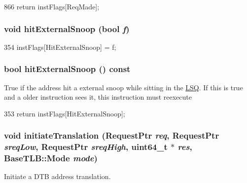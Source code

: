 \begin{DoxyCode}
866 { return instFlags[ReqMade]; }
\end{DoxyCode}
\hypertarget{classBaseDynInst_a75605c294a03028c695549f020222b2e}{
\subsubsection[{hitExternalSnoop}]{\setlength{\rightskip}{0pt plus 5cm}void hitExternalSnoop (bool {\em f})}}
\label{classBaseDynInst_a75605c294a03028c695549f020222b2e}



\begin{DoxyCode}
354 { instFlags[HitExternalSnoop] = f; }
\end{DoxyCode}
\hypertarget{classBaseDynInst_a58f775b4d0db28ea4537417ee746ba89}{
\subsubsection[{hitExternalSnoop}]{\setlength{\rightskip}{0pt plus 5cm}bool hitExternalSnoop () const}}
\label{classBaseDynInst_a58f775b4d0db28ea4537417ee746ba89}
True if the address hit a external snoop while sitting in the \hyperlink{classLSQ}{LSQ}. If this is true and a older instruction sees it, this instruction must reexecute 


\begin{DoxyCode}
353 { return instFlags[HitExternalSnoop]; }
\end{DoxyCode}
\hypertarget{classBaseDynInst_ae5c08b83b54ab954feb02df3e206c1f0}{
\subsubsection[{initiateTranslation}]{\setlength{\rightskip}{0pt plus 5cm}void initiateTranslation ({\bf RequestPtr} {\em req}, \/  {\bf RequestPtr} {\em sreqLow}, \/  {\bf RequestPtr} {\em sreqHigh}, \/  uint64\_\-t $\ast$ {\em res}, \/  {\bf BaseTLB::Mode} {\em mode})}}
\label{classBaseDynInst_ae5c08b83b54ab954feb02df3e206c1f0}
Initiate a DTB address translation. 


